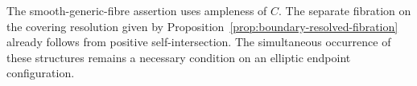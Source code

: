 The smooth-generic-fibre assertion uses ampleness of $C$.
The separate fibration on the covering resolution given by
Proposition~\ref{prop:boundary-resolved-fibration} already follows
from positive self-intersection.  The simultaneous occurrence of
these structures remains a necessary condition on an elliptic
endpoint configuration.
